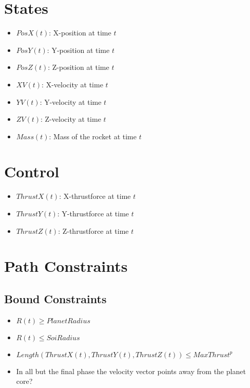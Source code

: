 \documentclass[11pt]{report}
\begin{document}
\section{States}

\begin{itemize}
\item $PosX(t)$: X-position at time $t$
\item $PosY(t)$: Y-position at time $t$
\item $PosZ(t)$: Z-position at time $t$

\item $XV(t)$: X-velocity at time $t$
\item $YV(t)$: Y-velocity at time $t$
\item $ZV(t)$: Z-velocity at time $t$

\item $Mass(t)$: Mass of the rocket at time $t$
\end{itemize}

\section{Control}

\begin{itemize}
\item $ThrustX(t)$: X-thrustforce at time $t$
\item $ThrustY(t)$: Y-thrustforce at time $t$
\item $ThrustZ(t)$: Z-thrustforce at time $t$
\end{itemize}

\section{Path Constraints}

\subsection{Bound Constraints}

\begin{itemize}
\item $R(t) \geq PlanetRadius$
\item $R(t) \leq SoiRadius$
\item $Length(ThrustX(t), ThrustY(t), ThrustZ(t)) \leq MaxThrust^p$
\item In all but the final phase the velocity vector points away from the planet core?
\end{itemize}
\end{document}

